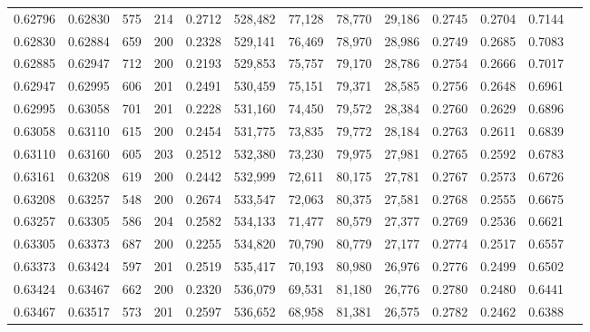 \begin{tabular}{rrrrrrrrrrrrr}
0.62796 & 0.62830 &   575 & 214 &                                     0.2712 & 528,482 &  77,128 &  78,770 &  29,186 & 0.2745 & 0.2704 & 0.7144 \\
0.62830 & 0.62884 &   659 & 200 &                                     0.2328 & 529,141 &  76,469 &  78,970 &  28,986 & 0.2749 & 0.2685 & 0.7083 \\
0.62885 & 0.62947 &   712 & 200 &                                     0.2193 & 529,853 &  75,757 &  79,170 &  28,786 & 0.2754 & 0.2666 & 0.7017 \\
0.62947 & 0.62995 &   606 & 201 &                                     0.2491 & 530,459 &  75,151 &  79,371 &  28,585 & 0.2756 & 0.2648 & 0.6961 \\
0.62995 & 0.63058 &   701 & 201 &                                     0.2228 & 531,160 &  74,450 &  79,572 &  28,384 & 0.2760 & 0.2629 & 0.6896 \\
0.63058 & 0.63110 &   615 & 200 &                                     0.2454 & 531,775 &  73,835 &  79,772 &  28,184 & 0.2763 & 0.2611 & 0.6839 \\
0.63110 & 0.63160 &   605 & 203 &                                     0.2512 & 532,380 &  73,230 &  79,975 &  27,981 & 0.2765 & 0.2592 & 0.6783 \\
0.63161 & 0.63208 &   619 & 200 &                                     0.2442 & 532,999 &  72,611 &  80,175 &  27,781 & 0.2767 & 0.2573 & 0.6726 \\
0.63208 & 0.63257 &   548 & 200 &                                     0.2674 & 533,547 &  72,063 &  80,375 &  27,581 & 0.2768 & 0.2555 & 0.6675 \\
0.63257 & 0.63305 &   586 & 204 &                                     0.2582 & 534,133 &  71,477 &  80,579 &  27,377 & 0.2769 & 0.2536 & 0.6621 \\
0.63305 & 0.63373 &   687 & 200 &                                     0.2255 & 534,820 &  70,790 &  80,779 &  27,177 & 0.2774 & 0.2517 & 0.6557 \\
0.63373 & 0.63424 &   597 & 201 &                                     0.2519 & 535,417 &  70,193 &  80,980 &  26,976 & 0.2776 & 0.2499 & 0.6502 \\
0.63424 & 0.63467 &   662 & 200 &                                     0.2320 & 536,079 &  69,531 &  81,180 &  26,776 & 0.2780 & 0.2480 & 0.6441 \\
0.63467 & 0.63517 &   573 & 201 &                                     0.2597 & 536,652 &  68,958 &  81,381 &  26,575 & 0.2782 & 0.2462 & 0.6388 \\

\end{tabular}
